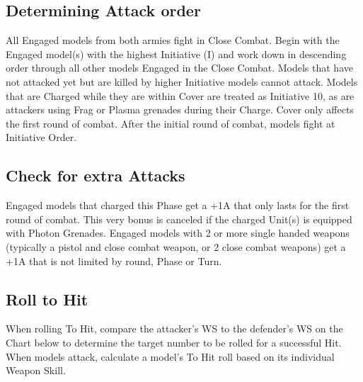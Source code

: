 \subsection{Determining Attack order}

All Engaged models from both armies fight in Close Combat.
Begin with the Engaged model(s) with the highest Initiative (I)
and work down in descending order through all other models
Engaged in the Close Combat. Models that have not attacked
yet but are killed by higher Initiative models cannot attack.
Models that are Charged while they are within Cover are
treated as Initiative 10, as are attackers using Frag or Plasma
grenades during their Charge. Cover only affects the first
round of combat. After the initial round of combat, models fight
at Initiative Order.

\subsection{Check for extra Attacks}

Engaged models that charged this Phase get a +1A that only
lasts for the first round of combat. This very bonus is canceled
if the charged Unit(s) is equipped with Photon Grenades.
Engaged models with 2 or more single handed weapons
(typically a pistol and close combat weapon, or 2 close combat
weapons) get a +1A that is not limited by round, Phase or Turn.

\subsection{Roll to Hit}

When rolling To Hit, compare the attacker's WS to the
defender's WS on the Chart below to determine the target
number to be rolled for a successful Hit. When models attack,
calculate a model's To Hit roll based on its individual Weapon
Skill.

